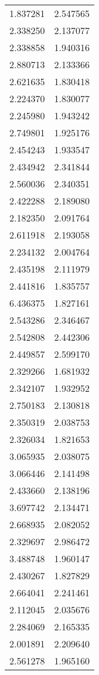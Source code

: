 \begin{longtable}[c]{ll}
    1.837281 & 2.547565 \\
    2.338250 & 2.137077 \\
    2.338858 & 1.940316 \\
    2.880713 & 2.133366 \\
    2.621635 & 1.830418 \\
    2.224370 & 1.830077 \\
    2.245980 & 1.943242 \\
    2.749801 & 1.925176 \\
    2.454243 & 1.933547 \\
    2.434942 & 2.341844 \\
    2.560036 & 2.340351 \\
    2.422288 & 2.189080 \\
    2.182350 & 2.091764 \\
    2.611918 & 2.193058 \\
    2.234132 & 2.004764 \\
    2.435198 & 2.111979 \\
    2.441816 & 1.835757 \\
    6.436375 & 1.827161 \\
    2.543286 & 2.346467 \\
    2.542808 & 2.442306 \\
    2.449857 & 2.599170 \\
    2.329266 & 1.681932 \\
    2.342107 & 1.932952 \\
    2.750183 & 2.130818 \\
    2.350319 & 2.038753 \\
    2.326034 & 1.821653 \\
    3.065935 & 2.038075 \\
    3.066446 & 2.141498 \\
    2.433660 & 2.138196 \\
    3.697742 & 2.134471 \\
    2.668935 & 2.082052 \\
    2.329697 & 2.986472 \\
    3.488748 & 1.960147 \\
    2.430267 & 1.827829 \\
    2.664041 & 2.241461 \\
    2.112045 & 2.035676 \\
    2.284069 & 2.165335 \\
    2.001891 & 2.209640 \\
    2.561278 & 1.965160 \\

\end{longtable}
